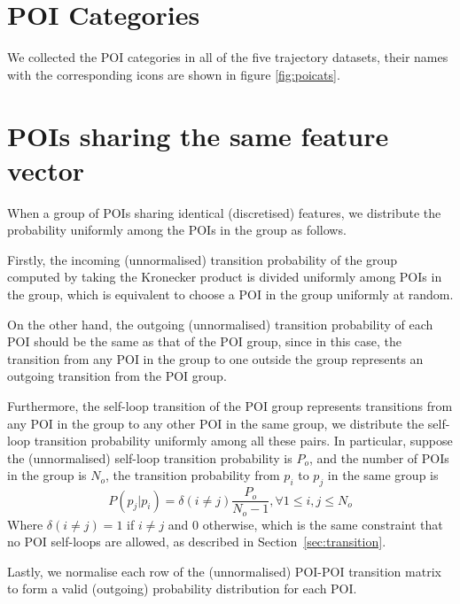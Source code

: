 \newpage

\appendix


\section{POI Categories}
We collected the POI categories in all of the five trajectory datasets,
their names with the corresponding icons are shown in figure \ref{fig:poicats}.


\section{POIs sharing the same feature vector}
When a group of POIs sharing identical (discretised) features,
we distribute the probability uniformly among the POIs in the group as follows.

Firstly, the incoming (unnormalised) transition probability of the group computed by taking 
the Kronecker product is divided uniformly among POIs in the group,
which is equivalent to choose a POI in the group uniformly at random.

On the other hand, the outgoing (unnormalised) transition probability of each POI 
should be the same as that of the POI group, 
since in this case, the transition from any POI in the group to one outside the group 
represents an outgoing transition from the POI group.

Furthermore, the self-loop transition of the POI group represents transitions from any POI in the group
to any other POI in the same group, we distribute the self-loop transition probability uniformly 
among all these pairs.
In particular, suppose the (unnormalised) self-loop transition probability is $P_o$,
and the number of POIs in the group is $N_o$,
the transition probability from $p_i$ to $p_j$ in the same group is
\begin{displaymath}
    P(p_j | p_i) = \delta(i \ne j) \frac{P_o}{N_o - 1}, \forall 1 \le i, j \le N_o
\end{displaymath}
Where $\delta(i \ne j) = 1$ if $i \ne j$ and $0$ otherwise, which is the same constraint that no POI
self-loops are allowed, as described in Section~\ref{sec:transition}.

Lastly, we normalise each row of the (unnormalised) POI-POI transition matrix 
to form a valid (outgoing) probability distribution for each POI.


